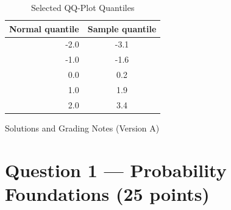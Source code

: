 \documentclass[11pt]{article}
\begin{document}
\begin{table}[h]
\centering
\caption{Selected QQ-Plot Quantiles}\label{tab:a-qq-sol}
\begin{tabular}{@{}rc@{}}
\toprule
\textbf{Normal quantile} & \textbf{Sample quantile}\\
\midrule
-2.0 & -3.1 \\
-1.0 & -1.6 \\
 0.0 &  0.2 \\
 1.0 &  1.9 \\
 2.0 &  3.4 \\
\bottomrule
\end{tabular}
\end{table}

\newpage

\begin{center}
{\LARGE Solutions and Grading Notes (Version A)}\\[0.5em]
\end{center}

\section*{Question 1 — Probability Foundations (25 points)}
\end{document}
